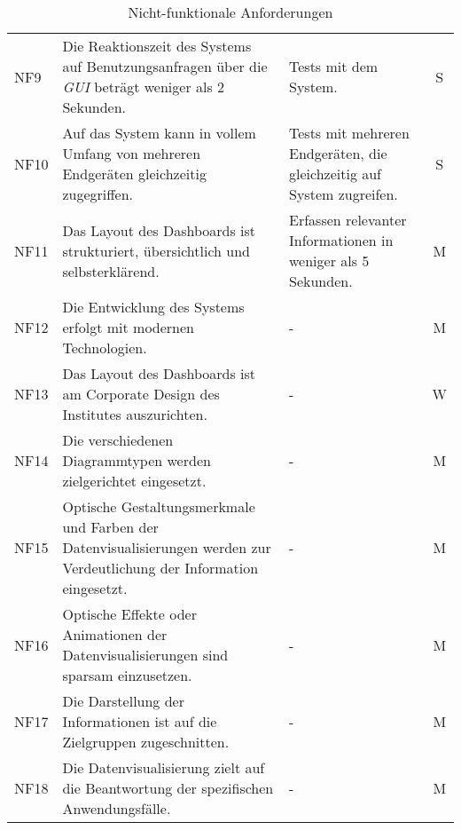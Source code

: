 \begin{table}[h]
\begin{adjustbox}{max width=\textwidth}
\begin{tabular}{lp{7.5cm}p{7.5cm}c}
        NF9                              &Die Reaktionszeit des Systems auf Benutzungsanfragen über die \textit{\acrshort{GUI}} beträgt weniger als 2 Sekunden. & Tests mit dem System.& S\\
        NF10                              &Auf das System kann in vollem Umfang von mehreren Endgeräten gleichzeitig zugegriffen. & Tests mit mehreren Endgeräten, die gleichzeitig auf System zugreifen.& S\\
        NF11                              &Das Layout des Dashboards ist strukturiert, übersichtlich und selbsterklärend. & Erfassen relevanter Informationen in weniger als 5 Sekunden.& M\\
        NF12                              &Die Entwicklung des Systems erfolgt mit modernen Technologien. & - & M\\
        NF13                              &Das Layout des Dashboards ist am Corporate Design des Institutes auszurichten. & -& W\\
        NF14                              &Die verschiedenen Diagrammtypen werden zielgerichtet eingesetzt. & -& M\\
        NF15                              &Optische Gestaltungsmerkmale und Farben der Datenvisualisierungen werden zur Verdeutlichung der Information eingesetzt. &- & M\\
        NF16                              &Optische Effekte oder Animationen der Datenvisualisierungen sind sparsam einzusetzen. & -& M\\
        NF17                              &Die Darstellung der Informationen ist auf die Zielgruppen zugeschnitten. & -& M\\
        NF18                              &Die Datenvisualisierung zielt auf die Beantwortung der spezifischen Anwendungsfälle. & -& M\\
       \bottomrule
    \end{tabular}
    \end{adjustbox}
    \caption{%
        Nicht-funktionale Anforderungen
    }
    \label{tab: nfAnforderungen}
    \end{table}
\endgroup
